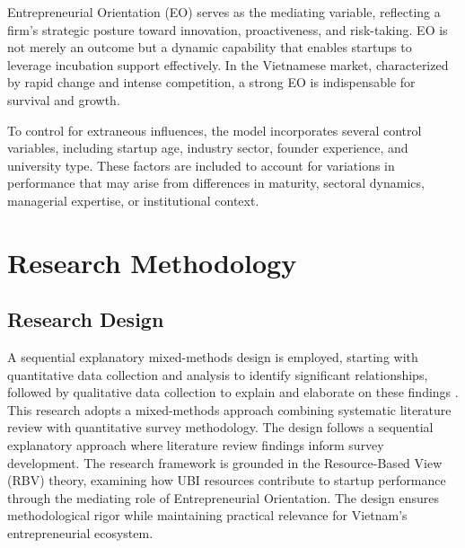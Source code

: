 \documentclass[../Main.tex]{subfiles}
\begin{document}
    Entrepreneurial Orientation (EO) serves as the mediating variable, reflecting a firm's strategic posture toward innovation, proactiveness, and risk-taking. EO is not merely an outcome but a dynamic capability that enables startups to leverage incubation support effectively. In the Vietnamese market, characterized by rapid change and intense competition, a strong EO is indispensable for survival and growth.

    To control for extraneous influences, the model incorporates several control variables, including startup age, industry sector, founder experience, and university type. These factors are included to account for variations in performance that may arise from differences in maturity, sectoral dynamics, managerial expertise, or institutional context.

    \section{Research Methodology}
    \label{section:4.2_Research_methodology}

    \subsection{Research Design}
    \label{subsection:4.2.1_Research_design}
    A sequential explanatory mixed-methods design is employed, starting with quantitative data collection and analysis to identify significant relationships, followed by qualitative data collection to explain and elaborate on these findings \cite{creswell2014research}. This research adopts a mixed-methods approach combining systematic literature review with quantitative survey methodology. The design follows a sequential explanatory approach where literature review findings inform survey development. The research framework is grounded in the Resource-Based View (RBV) theory, examining how UBI resources contribute to startup performance through the mediating role of Entrepreneurial Orientation. The design ensures methodological rigor while maintaining practical relevance for Vietnam's entrepreneurial ecosystem.
\end{document}
